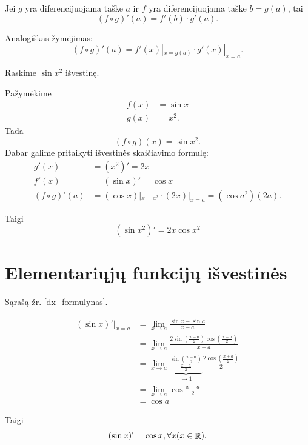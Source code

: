 \begin{prop}
  Jei $g$ yra diferencijuojama taške $a$ ir $f$ yra diferencijuojama 
  taške $b = g(a)$, tai
  \begin{equation*}
    (f \circ g)'(a) = f'(b) \cdot g'(a).
  \end{equation*}

  Analogiškas žymėjimas:
  \begin{equation*}
    (f \circ g)'(a) = f'(x)|_{x = g(a)} \cdot g'(x)|_{x = a}.
  \end{equation*}
\end{prop}

\begin{exmp}
  Raskime $\sin x^{2}$ išvestinę.

  Pažymėkime
  \begin{align*}
    f(x) &= \sin x \\
    g(x) &= x^{2}.
  \end{align*}
  Tada 
  \begin{equation*}
    (f \circ g)(x) = \sin x^{2}.
  \end{equation*}
  Dabar galime pritaikyti išvestinės skaičiavimo formulę:
  \begin{align*}
    g'(x) &= (x^{2})' = 2x \\
    f'(x) &= (\sin x)' = \cos x \\
    (f \circ g)'(a) &= (\cos x)|_{x = a^{2}} \cdot (2x)|_{x=a} 
      = (\cos a^2)(2a).
  \end{align*}

  Taigi
  \begin{equation*}
    (\sin x^{2})' = 2x \cos x^{2}
  \end{equation*}

\end{exmp}

\section{Elementariųjų funkcijų išvestinės}

Sąrašą žr. \ref{dx_formulynas}.

\begin{exmp}
  \begin{align*}
    (\sin x)'|_{x=a}
    &= \lim_{x \to a} \frac{\sin x - \sin a}{x - a} \\
    &= \lim_{x \to a} \frac{
      2 \sin \left( \frac{x - a}{2} \right) 
      \cos \left( \frac{x + a}{2} \right)
      }{x - a} \\
    &= \lim_{x \to a} 
      \underbrace{
        \frac{\sin \left( \frac{x - a}{2} \right)}{\frac{x - a}{2}}
      }_{\to 1}
      \frac{2 \cos \left( \frac{x + a}{2} \right)}{2} \\
      &= \lim_{x \to a} \cos \frac{x + a}{2} \\
      &= \cos a
  \end{align*}

  Taigi
  \begin{equation*}
    (\sin x)' = \cos x, \forall x (x \in \mathop{\mathbb{R}}).
  \end{equation*}
\end{exmp}

